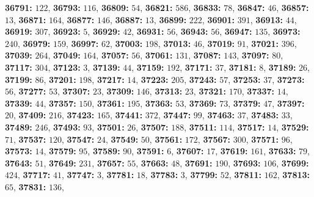 \textsf{\bfseries 36791:} $122$, \textsf{\bfseries 36793:} $116$, \textsf{\bfseries 36809:} $54$, \textsf{\bfseries 36821:} $586$, \textsf{\bfseries 36833:} $78$, \textsf{\bfseries 36847:} $46$, \textsf{\bfseries 36857:} $13$, \textsf{\bfseries 36871:} $164$, \textsf{\bfseries 36877:} $146$, \textsf{\bfseries 36887:} $13$, \textsf{\bfseries 36899:} $222$, \textsf{\bfseries 36901:} $391$, \textsf{\bfseries 36913:} $44$, \textsf{\bfseries 36919:} $307$, \textsf{\bfseries 36923:} $5$, \textsf{\bfseries 36929:} $42$, \textsf{\bfseries 36931:} $56$, \textsf{\bfseries 36943:} $56$, \textsf{\bfseries 36947:} $135$, \textsf{\bfseries 36973:} $240$, \textsf{\bfseries 36979:} $159$, \textsf{\bfseries 36997:} $62$, \textsf{\bfseries 37003:} $198$, \textsf{\bfseries 37013:} $46$, \textsf{\bfseries 37019:} $91$, \textsf{\bfseries 37021:} $396$, \textsf{\bfseries 37039:} $264$, \textsf{\bfseries 37049:} $164$, \textsf{\bfseries 37057:} $56$, \textsf{\bfseries 37061:} $131$, \textsf{\bfseries 37087:} $143$, \textsf{\bfseries 37097:} $80$, \textsf{\bfseries 37117:} $304$, \textsf{\bfseries 37123:} $3$, \textsf{\bfseries 37139:} $44$, \textsf{\bfseries 37159:} $192$, \textsf{\bfseries 37171:} $37$, \textsf{\bfseries 37181:} $8$, \textsf{\bfseries 37189:} $26$, \textsf{\bfseries 37199:} $86$, \textsf{\bfseries 37201:} $198$, \textsf{\bfseries 37217:} $14$, \textsf{\bfseries 37223:} $205$, \textsf{\bfseries 37243:} $57$, \textsf{\bfseries 37253:} $37$, \textsf{\bfseries 37273:} $56$, \textsf{\bfseries 37277:} $53$, \textsf{\bfseries 37307:} $23$, \textsf{\bfseries 37309:} $146$, \textsf{\bfseries 37313:} $23$, \textsf{\bfseries 37321:} $170$, \textsf{\bfseries 37337:} $14$, \textsf{\bfseries 37339:} $44$, \textsf{\bfseries 37357:} $150$, \textsf{\bfseries 37361:} $195$, \textsf{\bfseries 37363:} $53$, \textsf{\bfseries 37369:} $73$, \textsf{\bfseries 37379:} $47$, \textsf{\bfseries 37397:} $20$, \textsf{\bfseries 37409:} $216$, \textsf{\bfseries 37423:} $165$, \textsf{\bfseries 37441:} $372$, \textsf{\bfseries 37447:} $99$, \textsf{\bfseries 37463:} $37$, \textsf{\bfseries 37483:} $33$, \textsf{\bfseries 37489:} $246$, \textsf{\bfseries 37493:} $93$, \textsf{\bfseries 37501:} $26$, \textsf{\bfseries 37507:} $188$, \textsf{\bfseries 37511:} $114$, \textsf{\bfseries 37517:} $14$, \textsf{\bfseries 37529:} $71$, \textsf{\bfseries 37537:} $120$, \textsf{\bfseries 37547:} $24$, \textsf{\bfseries 37549:} $50$, \textsf{\bfseries 37561:} $172$, \textsf{\bfseries 37567:} $300$, \textsf{\bfseries 37571:} $96$, \textsf{\bfseries 37573:} $14$, \textsf{\bfseries 37579:} $95$, \textsf{\bfseries 37589:} $90$, \textsf{\bfseries 37591:} $6$, \textsf{\bfseries 37607:} $17$, \textsf{\bfseries 37619:} $161$, \textsf{\bfseries 37633:} $79$, \textsf{\bfseries 37643:} $51$, \textsf{\bfseries 37649:} $231$, \textsf{\bfseries 37657:} $55$, \textsf{\bfseries 37663:} $48$, \textsf{\bfseries 37691:} $190$, \textsf{\bfseries 37693:} $106$, \textsf{\bfseries 37699:} $424$, \textsf{\bfseries 37717:} $41$, \textsf{\bfseries 37747:} $3$, \textsf{\bfseries 37781:} $18$, \textsf{\bfseries 37783:} $3$, \textsf{\bfseries 37799:} $52$, \textsf{\bfseries 37811:} $162$, \textsf{\bfseries 37813:} $65$, \textsf{\bfseries 37831:} $136$, 
